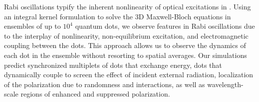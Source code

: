 Rabi oscillations typify the inherent nonlinearity of optical excitations in \qds{}.
Using an integral kernel formulation to solve the 3D Maxwell-Bloch equations in ensembles of up to $10^4$ quantum dots, we observe features in Rabi oscillations due to the interplay of nonlinearity, non-equilibrium excitation, and electromagnetic coupling between the dots.
This approach allows us to observe the dynamics of each dot in the ensemble without resorting to spatial averages.
Our simulations predict synchronized multiplets of dots that exchange energy, dots that dynamically couple to screen the effect of incident external radiation, localization of the polarization due to randomness and interactions, as well as wavelength-scale regions of enhanced and suppressed polarization.
